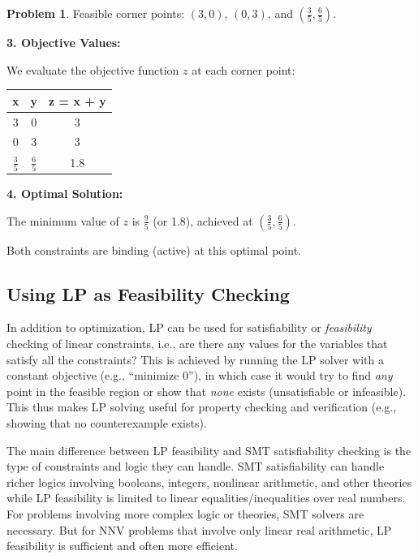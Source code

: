 \documentclass[oneside,11pt,dvipsnames]{book}
\numberwithin{equation}{section}
\theoremstyle{definition}
\newtheorem{problem}{Problem}[section]
\theoremstyle{remark}
\newenvironment{solution}{%
  \ifbool{showsol}{%
    \begin{mysolbox}%
        {\small \textbf{Solution}: }
  }{%
    \comment %
  }%
}{%
  \ifbool{showsol}{%
    \end{mysolbox}%
  }{%
    \endcomment %
  }%
}
\begin{document}
\begin{problem}
\begin{solution}
Feasible corner points: $(3,0)$, $(0,3)$, and $\left(\frac{3}{5}, \frac{6}{5}\right)$.

\textbf{3. Objective Values:}

We evaluate the objective function $z$ at each corner point:

\begin{center}
\begin{tabular}{ccc}
\hline
x & y & z = x + y \\
\hline
3 & 0 & 3 \\
0 & 3 & 3 \\
$\frac{3}{5}$ & $\frac{6}{5}$ & 1.8 \\
\hline
\end{tabular}
\end{center}

\textbf{4. Optimal Solution:}

The minimum value of $z$ is $\frac{9}{5}$ (or 1.8), achieved at $\left(\frac{3}{5}, \frac{6}{5}\right)$.

Both constraints are binding (active) at this optimal point.
\end{solution}
\end{problem}



\subsection{Using LP as Feasibility Checking}\label{sec:lp-feasibility}

In addition to optimization, LP can be used for satisfiability or \emph{feasibility} checking of linear constraints, i.e.,
are there any values for the variables that satisfy all the constraints?
This is achieved by running the LP solver with a constant objective (e.g., ``minimize 0''), in which case it would try to find \emph{any} point in the feasible region or show that \emph{none} exists (unsatisfiable or infeasible). This thus makes LP solving useful for property checking and verification (e.g., showing that no counterexample exists).


The main difference between LP feasibility and SMT satisfiability checking is the type of constraints and logic they can handle.
SMT satisfiability can handle richer logics involving booleans, integers, nonlinear arithmetic, and other theories while LP feasibility is limited to linear equalities/inequalities over real numbers. For problems involving more complex logic or theories, SMT solvers are necessary.
But for NNV problems that involve only linear real arithmetic, LP feasibility is sufficient and often more efficient. 
\end{document}
